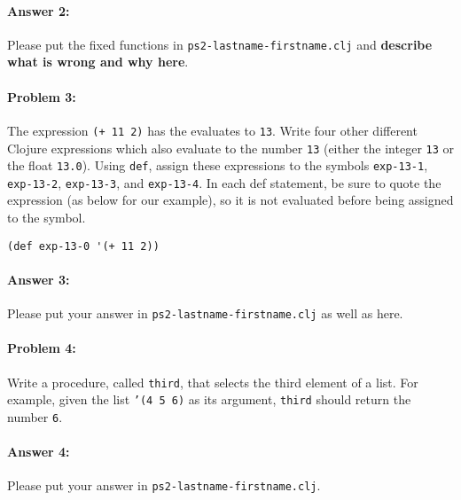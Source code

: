 \documentclass[10pt]{article}
\newcommand{\PSnum}{2}
\begin{document}
\paragraph{Answer 2:} Please put the fixed functions in
\texttt{ps\PSnum-lastname-firstname.clj} and
\textbf{describe what is wrong and why here}.

\noindent\hrulefill %

\paragraph{Problem 3:}
The expression \texttt{(+ 11 2)} has the evaluates to \texttt{13}. Write four
other different Clojure expressions which also evaluate to the number
\texttt{13} (either the integer \texttt{13} or the float \texttt{13.0}).
Using \texttt{def}, assign these expressions to the symbols
\texttt{exp-13-1}, \texttt{exp-13-2}, \texttt{exp-13-3}, and
\texttt{exp-13-4}.  
In each def statement, be sure to quote the expression (as below for our example),
so it is not evaluated before being assigned to the symbol.

\begin{lstlisting}
(def exp-13-0 '(+ 11 2))
\end{lstlisting}

\paragraph{Answer 3:} Please put your answer in \texttt{ps\PSnum-lastname-firstname.clj} as
well as here.

\noindent\hrulefill %

\paragraph{Problem 4:}
  Write a procedure, called \texttt{third}, that selects the third
  element of a list. For example, given the list \texttt{'(4 5 6)}
  as its argument, \texttt{third} should return the number \texttt{6}.

\paragraph{Answer 4:} Please put your answer in \texttt{ps\PSnum-lastname-firstname.clj}.

\noindent\hrulefill %
\end{document}
